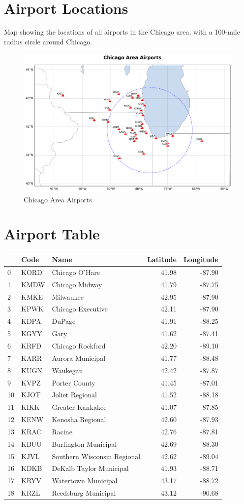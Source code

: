 \section{Airport Locations}
Map showing the locations of all airports in the Chicago area, with a 100-mile radius circle around Chicago.
\begin{figure}[htbp]
\centering
\includegraphics[width=0.7	extwidth]{airport_map.png}
\caption{Chicago Area Airports}
\label{fig:airport_map}
\end{figure}
\section{Airport Table}
\begin{tabular}{lllrr}
\toprule
 & Code & Name & Latitude & Longitude \\
\midrule
0 & KORD & Chicago O'Hare & 41.98 & -87.90 \\
1 & KMDW & Chicago Midway & 41.79 & -87.75 \\
2 & KMKE & Milwaukee & 42.95 & -87.90 \\
3 & KPWK & Chicago Executive & 42.11 & -87.90 \\
4 & KDPA & DuPage & 41.91 & -88.25 \\
5 & KGYY & Gary & 41.62 & -87.41 \\
6 & KRFD & Chicago Rockford & 42.20 & -89.10 \\
7 & KARR & Aurora Municipal & 41.77 & -88.48 \\
8 & KUGN & Waukegan & 42.42 & -87.87 \\
9 & KVPZ & Porter County & 41.45 & -87.01 \\
10 & KJOT & Joliet Regional & 41.52 & -88.18 \\
11 & KIKK & Greater Kankakee & 41.07 & -87.85 \\
12 & KENW & Kenosha Regional & 42.60 & -87.93 \\
13 & KRAC & Racine & 42.76 & -87.81 \\
14 & KBUU & Burlington Municipal & 42.69 & -88.30 \\
15 & KJVL & Southern Wisconsin Regional & 42.62 & -89.04 \\
16 & KDKB & DeKalb Taylor Municipal & 41.93 & -88.71 \\
17 & KRYV & Watertown Municipal & 43.17 & -88.72 \\
18 & KRZL & Reedsburg Municipal & 43.12 & -90.68 \\

\end{tabular}
